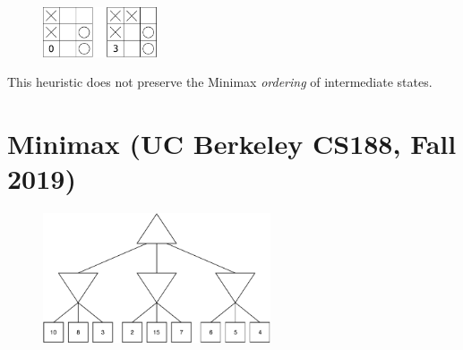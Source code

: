 \documentclass[11pt, a4paper]{article}
\begin{document}
\begin{enumerate}
\begin{solution}
        \begin{figure}[h]
            \centering
            \includegraphics[width=0.3\textwidth]{figures/e2_misleading.pdf}
        \end{figure}

        This heuristic does not preserve the Minimax \emph{ordering} of intermediate states.
    \end{solution}

\end{enumerate}

\newpage

\section{Minimax (UC Berkeley CS188, Fall 2019)}

\begin{figure}[h]
    \centering
    \includegraphics[width=0.6\textwidth]{figures/e2_minimax_0.pdf}
\end{figure}
\end{document}
